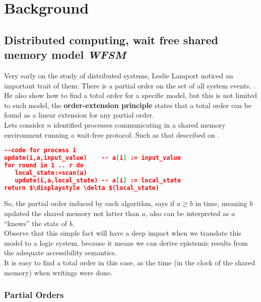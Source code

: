\documentclass[oneside,openany]{tufte-book} %
\newcommand{\sh}{\textbf{\textit{WFSM}}\xspace}
\begin{document}

\chapter{Background} %
\section{Distributed computing, wait free shared memory model \sh}

Very early on the study of distributed systems, Leslie Lamport noticed an important trait of them: There is a partial order on the set of all system events. \cite{Lamport78}. He also show how to find a total order for a specific model, but this is not limited to such model, the {\bf order-extension principle} states that a total order can be found as a linear extension for any partial order.\\

Lets consider $n$ identified processes communicating in a shared memory environment running a wait-free protocol. Such as that described on \cite{Herlihy1999}.\\

\begin{lstlisting}[mathescape,language=json,firstnumber=1,basicstyle=\footnotesize,commentstyle=\color{gray},caption={Normal form wait free protocol},label=amb]
--code for process i 
update(i,a,input_value)    -- a[i] := input_value
for round in 1 .. r do
   local_state:=scan(a)
   update(i,a,local_state) -- a[i] := local_state
return $\displaystyle \delta $(local_state)
\end{lstlisting}

So, the partial order induced by such algorithm, says if $a \ge b$ in time, meaning $b$ updated the shared memory not latter than $a$, also can be interpreted as $a$ ``knows'' the state of $b$. \\
Observe that this simple fact will have a deep impact when we translate this model to a logic system, because it means we can derive epistemic results from the adequate accessibility semantics.\\
It is easy to find a total order in this case, as the time (in the clock of the shared memory) when writings were done.

\subsection{Partial Orders}
\end{document}

